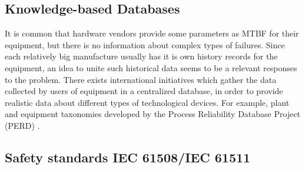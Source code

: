 \subsection{Knowledge-based Databases}

It is common that hardware vendors provide some parameters as MTBF for their
equipment, but there is no information about complex types of failures. Since
each relatively big manufacture usually has it is own history records for the
equipment, an idea to unite such historical data seems to be a relevant
responses to the problem. There exists international initiatives which gather
the data collected by users of equipment in a centralized database, in order to provide realistic data about
different types of technological devices. For example, plant and equipment
taxonomies developed by the Process Reliability Database Project (PERD)
\cite{reliabililty_database}.


\subsection{Safety standards {IEC 61508/IEC 61511}}

